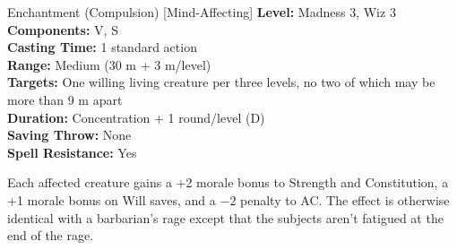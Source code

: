 {Enchantment (Compulsion) [Mind-Affecting]}
{
	\textbf{Level:}
	Madness 3, Wiz 3\\
	\textbf{Components:}
	V, S\\
	\textbf{Casting Time:}
	1 standard action\\
	\textbf{Range:}
	Medium (30 m + 3 m/level)\\
	\textbf{Targets:}
	One willing living creature per three levels, no two of which may be more than 9 m apart\\
	\textbf{Duration:}
	Concentration + 1 round/level (D)\\
	\textbf{Saving Throw:}
	None\\
	\textbf{Spell Resistance:}
	Yes\\
}
{
	Each affected creature gains a +2 morale bonus to Strength and Constitution, a +1 morale bonus on Will saves, and a $-2$ penalty to AC. The effect is otherwise identical with a barbarian's rage except that the subjects aren't fatigued at the end of the rage.

}
